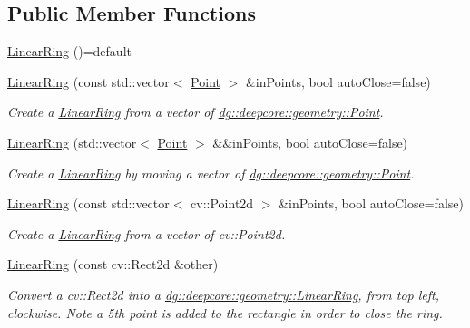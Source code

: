 \subsection*{Public Member Functions}
\begin{DoxyCompactItemize}
\item 
\hyperlink{structdg_1_1deepcore_1_1geometry_1_1_linear_ring_a5b551aabee61fe3e6a95f3872563daaf}{Linear\+Ring} ()=default
\item 
\hyperlink{structdg_1_1deepcore_1_1geometry_1_1_linear_ring_a58b6aa0cae0d42f832fd47d5ae27e00e}{Linear\+Ring} (const std\+::vector$<$ \hyperlink{structdg_1_1deepcore_1_1geometry_1_1_point}{Point} $>$ \&in\+Points, bool auto\+Close=false)
\begin{DoxyCompactList}\small\item\em Create a \hyperlink{structdg_1_1deepcore_1_1geometry_1_1_linear_ring}{Linear\+Ring} from a vector of \hyperlink{structdg_1_1deepcore_1_1geometry_1_1_point}{dg\+::deepcore\+::geometry\+::\+Point}. \end{DoxyCompactList}\item 
\hyperlink{structdg_1_1deepcore_1_1geometry_1_1_linear_ring_abb525758b8d1f0b5d29dde5c3cbe8973}{Linear\+Ring} (std\+::vector$<$ \hyperlink{structdg_1_1deepcore_1_1geometry_1_1_point}{Point} $>$ \&\&in\+Points, bool auto\+Close=false)
\begin{DoxyCompactList}\small\item\em Create a \hyperlink{structdg_1_1deepcore_1_1geometry_1_1_linear_ring}{Linear\+Ring} by moving a vector of \hyperlink{structdg_1_1deepcore_1_1geometry_1_1_point}{dg\+::deepcore\+::geometry\+::\+Point}. \end{DoxyCompactList}\item 
\hyperlink{structdg_1_1deepcore_1_1geometry_1_1_linear_ring_a58057e93b7b6cc50a0611f11aac17fa9}{Linear\+Ring} (const std\+::vector$<$ cv\+::\+Point2d $>$ \&in\+Points, bool auto\+Close=false)
\begin{DoxyCompactList}\small\item\em Create a \hyperlink{structdg_1_1deepcore_1_1geometry_1_1_linear_ring}{Linear\+Ring} from a vector of cv\+::\+Point2d. \end{DoxyCompactList}\item 
\hyperlink{structdg_1_1deepcore_1_1geometry_1_1_linear_ring_ae37fb6e59aa30e09f524ca7c2c09134e}{Linear\+Ring} (const cv\+::\+Rect2d \&other)
\begin{DoxyCompactList}\small\item\em Convert a cv\+::\+Rect2d into a \hyperlink{structdg_1_1deepcore_1_1geometry_1_1_linear_ring}{dg\+::deepcore\+::geometry\+::\+Linear\+Ring}, from top left, clockwise. Note a 5th point is added to the rectangle in order to close the ring. \end{DoxyCompactList}\item 

\end{DoxyCompactItemize}
